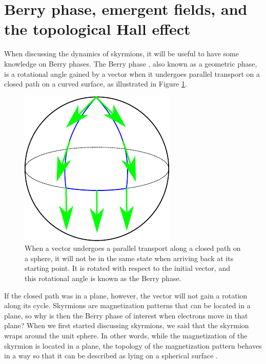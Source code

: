 \section{Berry phase, emergent fields, and the topological Hall effect} \label{sec:Berry}
When discussing the dynamics of skyrmions, it will be useful to have some knowledge on Berry phases. The Berry phase \cite{Berry1984}, also known as a geometric phase, is a rotational angle gained by a vector when it undergoes parallel transport on a closed path on a curved surface, as illustrated in Figure \ref{fig:Berry}.
\begin{figure}[h!]
\centering
  \centering
  \includegraphics[width=.4\linewidth]{Figures/BerryPhase}
\caption{When a vector undergoes a parallel transport along a closed path on a sphere, it will not be in the same state when arriving back at its starting point. It is rotated with respect to the initial vector, and this rotational angle is known as the Berry phase.}
\label{fig:Berry}
\end{figure}
If the closed path was in a plane, however, the vector will not gain a rotation along its cycle. Skyrmions are magnetization patterns that can be located in a plane, so why is then the Berry phase of interest when electrons move in that plane? When we first started discussing skyrmions, we said that the skyrmion wraps around the unit sphere. In other words, while the magnetization of the skyrmion is located in a plane, the topology of the magnetization pattern behaves in a way so that it can be described as lying on a spherical surface \cite{Everschor-Sitte2014}. 

